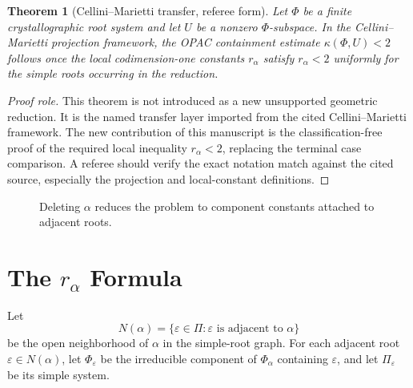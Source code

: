 \documentclass[11pt]{book}
\newtheorem{theorem}{Theorem}[chapter]
\theoremstyle{definition}
\begin{document}
\begin{theorem}[Cellini--Marietti transfer, referee form]\label{thm:transfer}
Let $\Phi$ be a finite crystallographic root system and let $U$ be a nonzero $\Phi$-subspace. In the Cellini--Marietti projection framework, the OPAC containment estimate $\kappa(\Phi,U)<2$ follows once the local codimension-one constants $r_\alpha$ satisfy $r_\alpha<2$ uniformly for the simple roots occurring in the reduction.
\end{theorem}

\begin{proof}[Proof role]
This theorem is not introduced as a new unsupported geometric reduction. It is the named transfer layer imported from the cited Cellini--Marietti framework. The new contribution of this manuscript is the classification-free proof of the required local inequality $r_\alpha<2$, replacing the terminal case comparison. A referee should verify the exact notation match against the cited source, especially the projection and local-constant definitions.
\end{proof}

\begin{figure}[h]
\centering
{}
\caption{Deleting $\alpha$ reduces the problem to component constants attached to adjacent roots.}
\end{figure}

\chapter{The $r_\alpha$ Formula}
Let
\[
 N(\alpha)=\{\varepsilon\in\Pi: \varepsilon\text{ is adjacent to }\alpha\}
\]
be the open neighborhood of $\alpha$ in the simple-root graph. For each adjacent root $\varepsilon\in N(\alpha)$, let $\Phi_\varepsilon$ be the irreducible component of $\Phi_\alpha$ containing $\varepsilon$, and let $\Pi_\varepsilon$ be its simple system.
\end{document}
